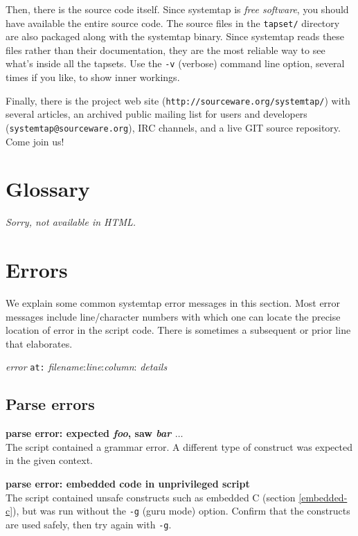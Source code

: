 \documentclass{article}
\renewcommand{\nomenclature}[2]{}
\begin{document}
Then, there is the source code itself.  Since systemtap is {\em free
software}, you should have available the entire source code.  The
source files in the \verb+tapset/+ directory are also packaged along
with the systemtap binary.  Since systemtap reads these files rather
than their documentation, they are the most reliable way to see what's
inside all the tapsets.  Use the \verb+-v+ (verbose) command line
option, several times if you like, to show inner workings.
\nomenclature{free software}{Software licensed under terms such as the
GNU GPL, which aims to enforce certain specified user freedoms such
as study, modification, and sharing.}

Finally, there is the project web site
(\verb+http://sourceware.org/systemtap/+) with several articles,
an archived public mailing list for users and developers
(\verb+systemtap@sourceware.org+), IRC channels,
and a live GIT source repository.  Come join us!


\appendix

\section{Glossary}
\renewcommand{\nomname}{}
\printglossary
\begin{htmlonly}
{\em Sorry, not available in HTML.}
\end{htmlonly}

\section{Errors}

We explain some common systemtap error messages in this section.  Most
error messages include line/character numbers with which one can
locate the precise location of error in the script code.  There is
sometimes a subsequent or prior line that elaborates.

{\large {\em error} {\tt at:} {\em filename}:{\em line}:{\em column}: {\em details}}

\subsection{Parse errors}

\begin{description}
\item{\bf parse error: expected {\em foo}, saw {\em bar} $\ldots$} \\
The script contained a grammar error.  A different type of construct
was expected in the given context.

\item{\bf parse error: embedded code in unprivileged script} \\ The
script contained unsafe constructs such as embedded C (section
\ref{embedded-c}), but was run without the \verb+-g+ (guru mode)
option.  Confirm that the constructs are used safely, then try
again with \verb+-g+.
\end{description}
\end{document}
